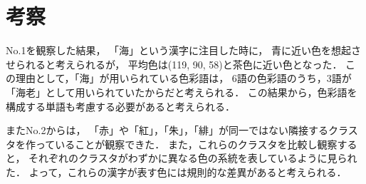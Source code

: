 \documentclass[a4j,twocolumn]{ujarticle} %
\newcommand{\workname}{緋色の習作}
\newcommand{\colorname}{色彩語}
\newcommand{\colorkanji}{色彩漢字}
\newcommand{\recallcolor}{色イメージ}
\newcommand{\mysection}[1]{\vspace{-23pt}\section{#1}\vspace{-5pt}}
\begin{document}
% 
% 
% 




\mysection{考察}
\label{consideration}

No.1を観察した結果，
「海」という漢字に注目した時に，
青に近い色を想起させられると考えられるが，
平均色は(119, 90, 58)と茶色に近い色となった．
この理由として，「海」が用いられている\colorname{}は，
6語の\colorname{}のうち，3語が「海老」として用いられていたからだと考えられる．
この結果から，\colorname{}を構成する単語も考慮する必要があると考えられる．

またNo.2からは，
「赤」や「紅」，「朱」，「緋」が同一ではない隣接するクラスタを作っていることが観察できた．
また，これらのクラスタを比較し観察すると，
それぞれのクラスタがわずかに異なる色の系統を表しているように見られた．
よって，これらの漢字が表す色には規則的な差異があると考えられる．
\end{document}
